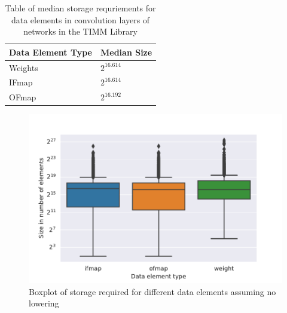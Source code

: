 \begin{table}[]
    \center
    \begin{tabular}{|l|l|}
    \hline
    Data Element Type & Median Size    \\ \hline
    Weights           & $2^{16.614}$   \\ \hline
    IFmap             & $2^{16.614}$   \\ \hline
    OFmap             & $2^{16.192}$   \\ \hline
    \end{tabular}
    \caption{Table of median storage requriements for data elements in convolution layers of networks in the TIMM Library}
    \label{tab:median_storage}
\end{table}

\begin{figure}[]
    \centering
    \includegraphics[scale=0.7]{Plots/storage/no_lowering.pdf}
    \caption{Boxplot of storage required for different data elements assuming no lowering}
    \label{fig:storage:no_lowering}
\end{figure}

